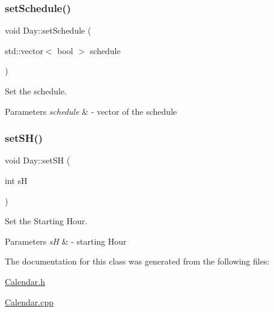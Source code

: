 \subsubsection{\texorpdfstring{set\+Schedule()}{setSchedule()}\hspace{0.1cm}{\footnotesize\ttfamily [2/2]}}
{\footnotesize\ttfamily void Day\+::set\+Schedule (\begin{DoxyParamCaption}\item[{std\+::vector$<$ bool $>$}]{schedule }\end{DoxyParamCaption})}



Set the schedule. 


\begin{DoxyParams}{Parameters}
{\em schedule} & -\/ vector of the schedule \\
\hline
\end{DoxyParams}
\mbox{\label{class_day_a6fc6dfeef1c92b9a5395648c4d0c8a70}} 
\subsubsection{\texorpdfstring{set\+S\+H()}{setSH()}}
{\footnotesize\ttfamily void Day\+::set\+SH (\begin{DoxyParamCaption}\item[{int}]{sH }\end{DoxyParamCaption})}



Set the Starting Hour. 


\begin{DoxyParams}{Parameters}
{\em sH} & -\/ starting Hour \\
\hline
\end{DoxyParams}


The documentation for this class was generated from the following files\+:\begin{DoxyCompactItemize}
\item 
\mbox{\hyperlink{_calendar_8h}{Calendar.\+h}}\item 
\mbox{\hyperlink{_calendar_8cpp}{Calendar.\+cpp}}\end{DoxyCompactItemize}
